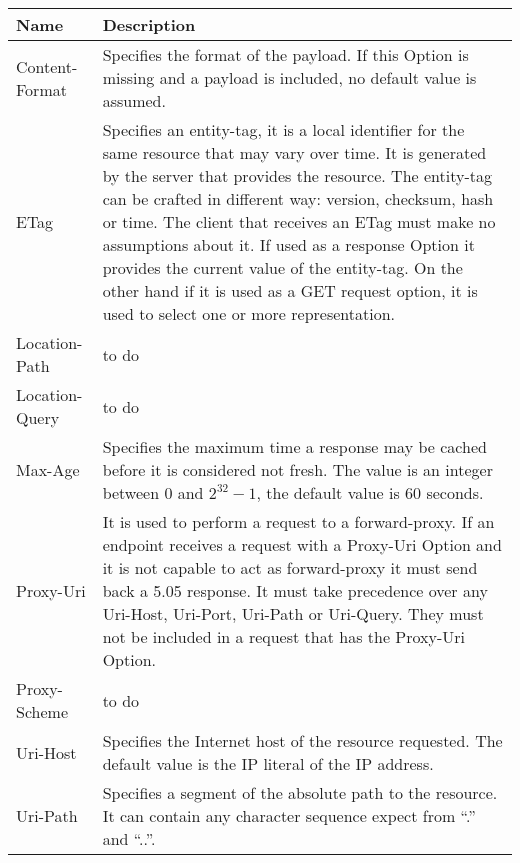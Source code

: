 	\begin{table}[h!]
		\begin{center}
			\begin{tabularx}{\textwidth}{|l|X|}
				\hline
				\textbf{Name} & \textbf{Description}\\\hline
				Content-Format & Specifies the format of the payload.
				If this Option is missing and a payload is included, no default value is assumed.\\\hline
				
				ETag & Specifies an entity-tag, it is a local identifier for the same resource that may vary over time.
				It is generated by the server that provides the resource.
				The entity-tag can be crafted in different way: version, checksum, hash or time.
				The client that receives an ETag must make no assumptions about it.
				If used as a response Option it provides the current value of the entity-tag.
				On the other hand if it is used as a GET request option, it is used to select one or more representation.\\\hline
				
				Location-Path & to do\\\hline
				
				Location-Query & to do\\\hline
				
				Max-Age &	Specifies the maximum time a response may be cached before it is considered not fresh.
				The value is an integer between 0 and $2^32-1$, the default value is 60 seconds.\\\hline
				
				Proxy-Uri & It is used to perform a request to a forward-proxy.
				If an endpoint receives a request with a Proxy-Uri Option and it is not capable to act as forward-proxy it must send back a 5.05 response.
				It must take precedence over any Uri-Host, Uri-Port, Uri-Path or Uri-Query.
				They must not be included in a request that has the Proxy-Uri Option.\\\hline
				
				Proxy-Scheme & to do\\\hline
				
				Uri-Host & Specifies the Internet host of the resource requested.
				The default value is the IP literal of the IP address.\\\hline
				
				Uri-Path & Specifies a segment of the absolute path to the resource.
				It can contain any character sequence expect from “.” and “..”.\\\hline
				

\end{tabularx}
\end{center}
\end{table}
